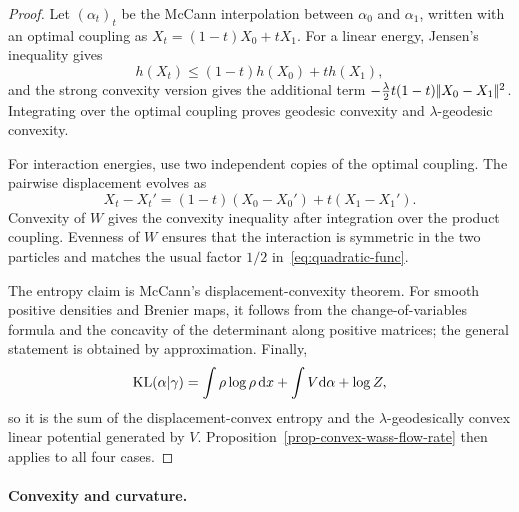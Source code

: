 \begin{proof}
	Let $(\alpha_t)_t$ be the McCann interpolation between $\alpha_0$ and $\alpha_1$, written with an optimal coupling as $X_t=(1-t)X_0+tX_1$. For a linear energy, Jensen's inequality gives
	\[
		h(X_t)\leq(1-t)h(X_0)+t h(X_1),
	\]
	and the strong convexity version gives the additional term $-\frac{\lambda}{2}t(1-t)|\!| X_0-X_1 |\!|^2$. Integrating over the optimal coupling proves geodesic convexity and $\lambda$-geodesic convexity.

	For interaction energies, use two independent copies of the optimal coupling. The pairwise displacement evolves as
	\[
		X_t-X_t'=(1-t)(X_0-X_0')+t(X_1-X_1').
	\]
	Convexity of $W$ gives the convexity inequality after integration over the product coupling. Evenness of $W$ ensures that the interaction is symmetric in the two particles and matches the usual factor $1/2$ in~\eqref{eq:quadratic-func}.

	The entropy claim is McCann's displacement-convexity theorem. For smooth positive densities and Brenier maps, it follows from the change-of-variables formula and the concavity of the determinant along positive matrices; the general statement is obtained by approximation. Finally,
	\[
		\operatorname{KL}(\alpha|\gamma)=\int\rho\log\rho\,\mathrm{d} x+\int V\mathrm{d}\alpha+\log Z,
	\]
	so it is the sum of the displacement-convex entropy and the $\lambda$-geodesically convex linear potential generated by $V$. Proposition~\ref{prop-convex-wass-flow-rate} then applies to all four cases.
\end{proof}

\paragraph{Convexity and curvature.}


